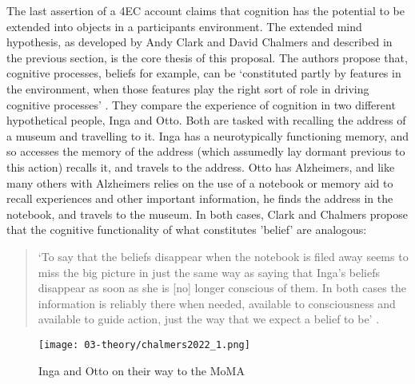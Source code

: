 The last assertion of a 4EC account claims that cognition has the potential to be extended into objects in a participants environment. The extended mind hypothesis, as developed by Andy Clark and David Chalmers and described in the previous section, is the core thesis of this proposal. The authors propose that, cognitive processes, beliefs for example, can be `constituted partly by features in the environment, when those features play the right sort of role in driving cognitive processes' \citeyearpar[p. 12]{clark1998}. They compare the experience of cognition in two different hypothetical people, Inga and Otto. Both are tasked with recalling the address of a museum and travelling to it. Inga has a neurotypically functioning memory, and so accesses the memory of the address (which assumedly lay dormant previous to this action) recalls it, and travels to the address. Otto has Alzheimers, and like many others with Alzheimers relies on the use of a notebook or memory aid to recall experiences and other important information, he finds the address in the notebook, and travels to the museum. In both cases, Clark and Chalmers propose that the cognitive functionality of what constitutes 'belief' are analogous:
\begin{quote}
    `To say that the beliefs disappear when the notebook is filed away seems to miss the big picture in just the same way as saying that Inga's beliefs disappear as soon as she is [no] longer conscious of them. In both cases the information is reliably there when needed, available to consciousness and available to guide action, just the way that we expect a belief to be' \citeyearpar[13]{clark1998}.
\end{quote}

\begin{figure}[ht]
    \centering
    \texttt{[image: 03-theory/chalmers2022\_1.png]}
    \captionsetup{justification=centering,margin=1.5cm}
    \caption{Inga and Otto on their way to the MoMA \citep[by Tim Peacock in][]{chalmers2022}}\label{fig: chalmers2022_1}
\end{figure}

